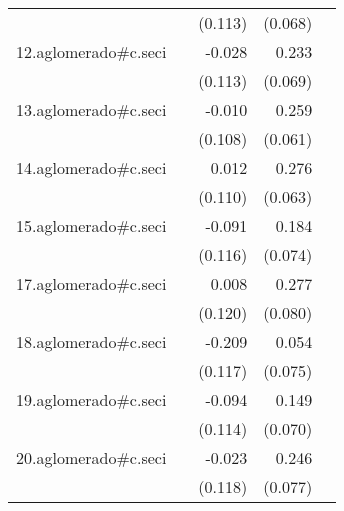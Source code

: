 {\begin{longtable}{l*{4}{D{.}{.}{-1}}}
            &                     &     (0.113)         &     (0.068)         &                     \\
\addlinespace
12.aglomerado#c.seci&                     &      -0.028         &       0.233\sym{***}&                     \\
            &                     &     (0.113)         &     (0.069)         &                     \\
\addlinespace
13.aglomerado#c.seci&                     &      -0.010         &       0.259\sym{***}&                     \\
            &                     &     (0.108)         &     (0.061)         &                     \\
\addlinespace
14.aglomerado#c.seci&                     &       0.012         &       0.276\sym{***}&                     \\
            &                     &     (0.110)         &     (0.063)         &                     \\
\addlinespace
15.aglomerado#c.seci&                     &      -0.091         &       0.184\sym{*}  &                     \\
            &                     &     (0.116)         &     (0.074)         &                     \\
\addlinespace
17.aglomerado#c.seci&                     &       0.008         &       0.277\sym{***}&                     \\
            &                     &     (0.120)         &     (0.080)         &                     \\
\addlinespace
18.aglomerado#c.seci&                     &      -0.209         &       0.054         &                     \\
            &                     &     (0.117)         &     (0.075)         &                     \\
\addlinespace
19.aglomerado#c.seci&                     &      -0.094         &       0.149\sym{*}  &                     \\
            &                     &     (0.114)         &     (0.070)         &                     \\
\addlinespace
20.aglomerado#c.seci&                     &      -0.023         &       0.246\sym{**} &                     \\
            &                     &     (0.118)         &     (0.077)         &                     \\

\end{longtable}}
